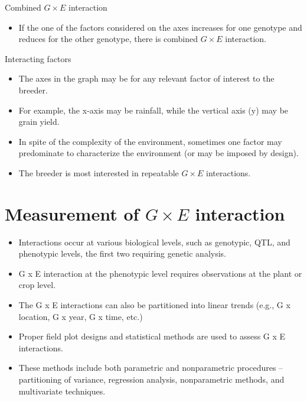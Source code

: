\documentclass[11pt,dvipsnames,ignorenonframetext,aspectratio=169]{beamer}
\providecommand{\tightlist}{%
  \setlength{\itemsep}{0pt}\setlength{\parskip}{0pt}}
\begin{document}
\begin{frame}{Combined \(G \times E\) interaction}
\protect\hypertarget{combined-g-times-e-interaction}{}

\begin{itemize}
\tightlist
\item
  If the one of the factors considered on the axes increases for one
  genotype and reduces for the other genotype, there is combined
  \(G \times E\) interaction.
\end{itemize}

\end{frame}

\begin{frame}{Interacting factors}
\protect\hypertarget{interacting-factors}{}

\begin{itemize}
\tightlist
\item
  The axes in the graph may be for any relevant factor of interest to
  the breeder.
\item
  For example, the x-axis may be rainfall, while the vertical axis (y)
  may be grain yield.
\item
  In spite of the complexity of the environment, sometimes one factor
  may predominate to characterize the environment (or may be imposed by
  design).
\item
  The breeder is most interested in repeatable \(G \times E\)
  interactions.
\end{itemize}

\end{frame}

\hypertarget{measurement-of-g-times-e-interaction}{%
\section{\texorpdfstring{Measurement of \(G \times E\)
interaction}{Measurement of G \textbackslash{}times E interaction}}\label{measurement-of-g-times-e-interaction}}

\begin{frame}{}
\protect\hypertarget{section-4}{}

\begin{itemize}
\tightlist
\item
  Interactions occur at various biological levels, such as genotypic,
  QTL, and phenotypic levels, the first two requiring genetic analysis.
\item
  G x E interaction at the phenotypic level requires observations at the
  plant or crop level.
\item
  The G x E interactions can also be partitioned into linear trends
  (e.g., G x location, G x year, G x time, etc.)
\item
  Proper field plot designs and statistical methods are used to assess G
  x E interactions.
\item
  These methods include both parametric and nonparametric procedures --
  partitioning of variance, regression analysis, nonparametric methods,
  and multivariate techniques.
\end{itemize}

\end{frame}
\end{document}
